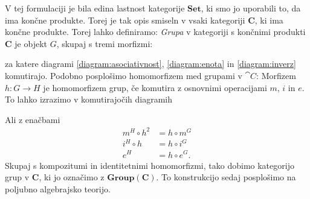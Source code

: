 \documentclass[../kategoricna_logika.tex]{subfiles}
\begin{document}
%
V tej formulaciji je bila edina lastnost kategorije $\mathbf{Set}$, ki smo jo uporabili to,
da ima končne produkte. Torej je tak opis smiseln v vsaki kategoriji $\mathbf{C}$,
ki ima končne produkte. Torej lahko definiramo:
\emph{Grupa} v kategoriji s končnimi produkti $\mathbf{C}$ je objekt
$G$, skupaj s tremi morfizmi:
\begin{center}
\end{center}
za katere diagrami \eqref{diagram:asociativnost}, \eqref{diagram:enota} in \eqref{diagram:inverz}
komutirajo.
%
Podobno posplošimo homomorfizem med grupami v $\cat{C}$: Morfizem
$h : G \to H$ je homomorfizem grup, če komutira z osnovnimi operacijami $m$, $i$ in $e$.
To lahko izrazimo v komutirajočih diagramih
%
\begin{center}
\end{center}
Ali z enačbami
\begin{align*}
m^H \circ h^2 &= h \circ m^G \\
i^H \circ h &= h \circ i^G \\
e^H &= h \circ e^G.
\end{align*}
Skupaj s kompozitumi in identitetnimi homomorfizmi, tako dobimo
kategorijo grup v $\mathbf{C}$, ki jo označimo z $\mathbf{Group}(\mathbf{C})$.
To konstrukcijo sedaj posplošimo na poljubno algebrajsko teorijo.
\end{document}
